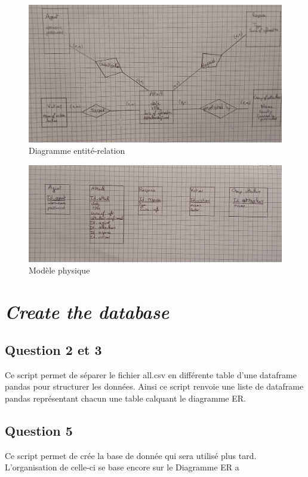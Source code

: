 \documentclass{ceri/sty/rapport}
\begin{document}
\begin{figure}[h]
    \centering
    \includegraphics[width=0.85\linewidth]{images/diag_er.png}
    \caption{Diagramme entité-relation}
    \label{fig:diag_er}
\end{figure}

\begin{figure}[h]
    \centering
    \includegraphics[width=0.85\linewidth]{images/diag_phys.png}
    \caption{Modèle physique}
    \label{fig:diag_phys}
\end{figure}

\section{\textit{Create the database}}
\subsection{Question 2 et 3}
Ce script permet de séparer le fichier all.csv en différente table d'une dataframe pandas pour structurer les données. Ainsi ce script renvoie une liste de dataframe pandas représentant chacun une table calquant le diagramme ER. 

\subsection{Question 5}
Ce script permet de crée la base de donnée qui sera utilisé plus tard. L'organisation de celle-ci se base encore sur le Diagramme ER a
\end{document}
